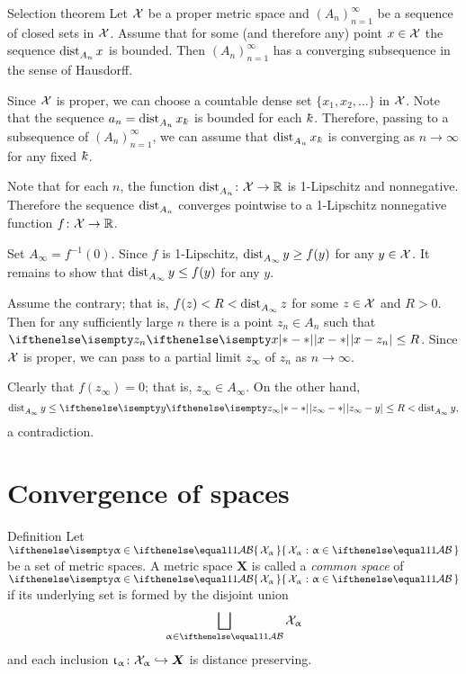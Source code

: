 



\begin{thm}{Selection theorem}
Let $\mathcal{X}$ be a proper metric  space
and $(A_n)_{n=1}^\infty$ be a sequence of closed sets in $\mathcal{X}$.
Assume that for some (and therefore any) point  $x\in\spc{X}$ 
the sequence $\mathop{\rm dist}\nolimits_{A_n}^{{}}x$ is bounded.
Then  $(A_n)_{n=1}^\infty$ has a converging subsequence in the sense of Hausdorff.
\end{thm}

Since $\mathcal{X}$ is proper,
we can choose a countable dense set $\{x_1,x_2, \dots\}$ in $\mathcal{X}$.
Note that the sequence $a_n=\distfun{A_n}x_\kay$ is bounded for each $\kay$. 
Therefore, passing to a subsequence of $(A_n)_{n=1}^\infty$,
we can assume that $\distfun{A_n}x_\kay$ is converging as $n\to\infty$ for any fixed $\kay$.

Note that for each $n$, the function $\distfun{A_n}\:\spc{X}\to\RR$ is 1-Lipschitz and nonnegative.
Therefore the sequence $\mathop{\rm dist}\nolimits_{A_n}^{{}}$ converges pointwise to a 1-Lipschitz nonnegative function $f\:\spc{X}\to\RR$.

Set $A_\infty=f^{-1}(0)$.
Since $f$ is 1-Lipschitz, 
$\distfun{A_\infty}y\ge f(y)$ for any $y\in \spc{X}$.
It remains to show that $\distfun{A_\infty}y\le f(y)$ for any $y$.

Assume the  contrary;
that is, $f(z)<R<\mathop{\rm dist}\nolimits_{A_\infty}^{{}}z$ for some $z\in \spc{X}$ and $R>0$.
Then for any sufficiently large $n$ there is a point $z_n\in A_n$ such that
$\dist{x}{z_n}{}\le R$.
Since $\mathcal{X}$ is proper, we can pass to a partial limit $z_\infty$ of $z_n$ as $n\to\infty$.

Clearly that $f(z_\infty)=0$; that is, $z_\infty\in A_\infty$.
On the other hand, 
\[\distfun{A_\infty}y\le\dist{z_\infty}{y}{}\le R<\distfun{A_\infty}y,\] 
a contradiction.
\qeds

\section{Convergence of spaces}

\begin{thm}{Definition}\label{def:comp-metr}
Let $\set{\spc{X}_\alpha}{\alpha\in\IndexSet}$ be a set of metric spaces.
A metric space $\bm{X}$
is called a \emph{common space} of $\set{\spc{X}_\alpha}{\alpha\in\IndexSet}$ if its underlying set is formed by the disjoint union $$\bigsqcup_{\alpha\in\IndexSet} \spc{X}_\alpha$$ 
and each inclusion $\iota_\alpha\:\spc{X}_\alpha\hookrightarrow\bm{X}$
is distance preserving.
\end{thm}

